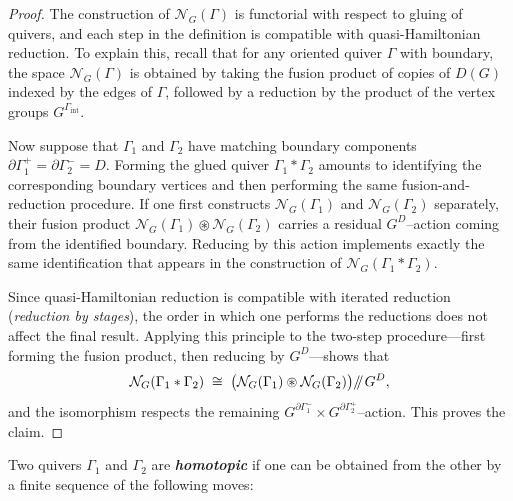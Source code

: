 \documentclass[reqno]{amsart}
\theoremstyle{plain}
\theoremstyle{definition}
\newcommand{\defn}[1]{\textbf{\textit{#1}}}
\newcommand{\N}{\mathcal{N}}
\newcommand{\sll}[1]{\mkern-4mu\mathbin{/\mkern-5mu/}_{\mkern-4mu{#1}}}
\begin{document}
\begin{proof}
The construction of $\N_G(\Gamma)$ is functorial with respect to gluing of
quivers, and each step in the definition is compatible with quasi-Hamiltonian
reduction.  To explain this, recall that for any oriented quiver $\Gamma$ with
boundary, the space $\N_G(\Gamma)$ is obtained by taking the fusion product of
copies of $D(G)$ indexed by the edges of $\Gamma$, followed by a reduction by
the product of the vertex groups $G^{\Gamma_{\mathrm{int}}}$.

Now suppose that $\Gamma_1$ and $\Gamma_2$ have matching boundary components
$\partial\Gamma_1^+=\partial\Gamma_2^- = D$.  Forming the glued quiver
$\Gamma_1 * \Gamma_2$ amounts to identifying the corresponding boundary
vertices and then performing the same fusion-and-reduction procedure.  If one
first constructs $\N_G(\Gamma_1)$ and $\N_G(\Gamma_2)$ separately, their
fusion product $\N_G(\Gamma_1)\circledast \N_G(\Gamma_2)$ carries a residual
$G^D$–action coming from the identified boundary.  Reducing by this action
implements exactly the same identification that appears in the construction of
$\N_G(\Gamma_1 * \Gamma_2)$.

Since quasi-Hamiltonian reduction is compatible with iterated reduction
(\emph{reduction by stages}), the order in which one performs the reductions
does not affect the final result.  Applying this principle to the two-step
procedure—first forming the fusion product, then reducing by $G^D$—shows that
\[
\N_G(\Gamma_1 * \Gamma_2)
\;\cong\;
\bigl(\N_G(\Gamma_1)\circledast \N_G(\Gamma_2)\bigr)\sll{} G^D,
\]
and the isomorphism respects the remaining
$G^{\partial\Gamma_1^-}\times G^{\partial\Gamma_2^+}$–action.  This proves the
claim.
\end{proof}


Two quivers $\Gamma_{1}$ and $\Gamma_2$ are \defn{homotopic} if one can be obtained from the other by a finite sequence of the following moves: 
\end{document}
